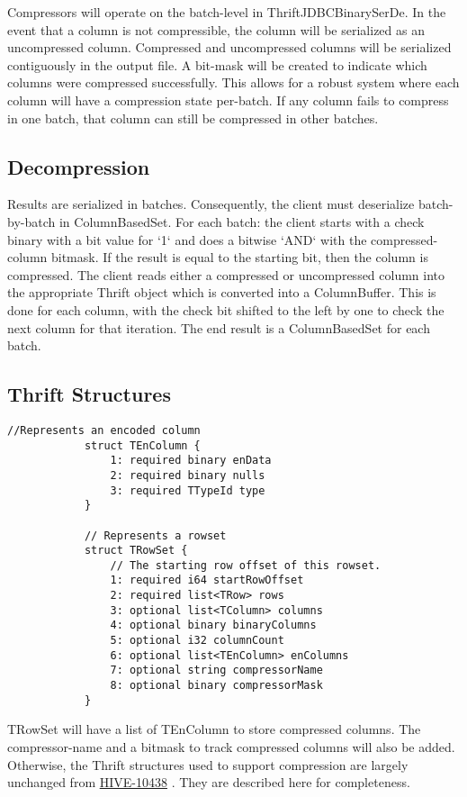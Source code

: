 \documentclass[11pt,a4paper]{article}
\begin{document}
		Compressors will operate on the batch-level in ThriftJDBCBinarySerDe.
		In the event that a column is not compressible, the column will be serialized as an uncompressed column.
		Compressed and uncompressed columns will be serialized contiguously in the output file. A bit-mask will be created to indicate which columns were compressed successfully.
		This allows for a robust system where each column will have a compression state per-batch. If any column fails to compress in one batch, that column can still be compressed in other batches.
		
		
	\subsection{Decompression}
		Results are serialized in batches.
		Consequently, the client must deserialize batch-by-batch in ColumnBasedSet.
		For each batch: the client starts with a check binary with a bit value for `1` and does a bitwise `AND` with the compressed-column bitmask.
		If the result is equal to the starting bit, then the column is compressed.
		The client reads either a compressed or uncompressed column into the appropriate Thrift object which is converted into a ColumnBuffer.
		This is done for each column, with the check bit shifted to the left by one to check the next column for that iteration.
		The end result is a ColumnBasedSet for each batch.
	
	\subsection{Thrift Structures}
		
		\begin{lstlisting}[title=TCLIService.thrift,gobble=8,otherkeywords={binary,i32,i64,string,struct,TColumn,TEnColumn,TRow,TRowSet,TTypeId}]
			//Represents an encoded column
			struct TEnColumn {
				1: required binary enData
				2: required binary nulls
				3: required TTypeId type
			}
			
			// Represents a rowset
			struct TRowSet {
				// The starting row offset of this rowset.
				1: required i64 startRowOffset
				2: required list<TRow> rows
				3: optional list<TColumn> columns
				4: optional binary binaryColumns
				5: optional i32 columnCount
				6: optional list<TEnColumn> enColumns
				7: optional string compressorName
				8: optional binary compressorMask
			}
		\end{lstlisting}
		
		TRowSet will have a list of TEnColumn to store compressed columns. The compressor-name and a bitmask to track compressed columns will also be added.
		Otherwise, the Thrift structures used to support compression are largely unchanged from 
		\href{https://issues.apache.org/jira/browse/HIVE-10438}{HIVE-10438}
		. They are described here for completeness.
		
\end{document}
